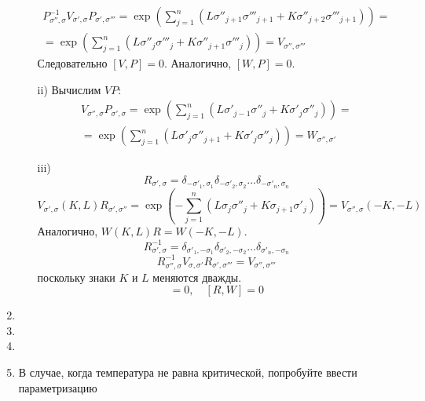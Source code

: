 \documentclass[12pt]{article}
\theoremstyle{definition}
\begin{document}
\begin{enumerate}
\begin{itemize}
\begin{multline}
            P_{\sigma'',\sigma}^{-1}V_{\sigma',\sigma}P_{\sigma',\sigma'''}=\exp\left(\sum\limits_{j=1}^n(L\sigma''_{j+1}\sigma'''_{j+1}+K\sigma''_{j+2}\sigma'''_{j+1})\right)=\\=\exp\left(\sum\limits_{j=1}^n(L\sigma''_j\sigma'''_j+K\sigma''_{j+1}\sigma'''_j)\right)=V_{\sigma'',\sigma'''}
        \end{multline}
        Следовательно $[V,P]=0$. Аналогично, $[W,P]=0$.
        \item[ii)] Вычислим $VP$:
        \begin{multline}
            V_{\sigma'',\sigma}P_{\sigma',\sigma}=\exp\left(\sum\limits_{j=1}^n(L\sigma'_{j-1}\sigma''_j+K\sigma'_j\sigma''_j)\right)=\\=\exp\left(\sum\limits_{j=1}^n(L\sigma'_j\sigma''_{j+1}+K\sigma'_j\sigma''_j)\right)=W_{\sigma'',\sigma'}
        \end{multline}
        \item[iii)]
        \begin{equation}
            R_{\sigma',\sigma}=\delta_{-\sigma'_1,\sigma_1}\delta_{-\sigma'_2,\sigma_2}...\delta_{-\sigma'_n,\sigma_n}
        \end{equation}
        \begin{equation}
            V_{\sigma',\sigma}(K,L)R_{\sigma',\sigma''}=\exp(-\sum\limits_{j=1}^n(L\sigma_j\sigma''_j+K\sigma_{j+1}\sigma'_j))=V_{\sigma'',\sigma}(-K,-L)
        \end{equation}
        Аналогично, $W(K,L)R=W(-K,-L)$.
        \begin{equation}
            R^{-1}_{\sigma',\sigma}=\delta_{\sigma'_1,-\sigma_1}\delta_{\sigma'_2,-\sigma_2}...\delta_{\sigma'_n,-\sigma_n}
        \end{equation}
        \begin{equation}
            R^{-1}_{\sigma'',\sigma}V_{\sigma,\sigma'}R_{\sigma',\sigma'''}=V_{\sigma'',\sigma'''}
        \end{equation}
        поскольку знаки $K$ и $L$ меняются дважды.
        \begin{equation}
            [R,V]=0,\quad[R,W]=0
        \end{equation}
    \end{itemize}
    \item
    \item
    \item
    \item В случае, когда температура не равна критической, попробуйте ввести параметризацию
    \begin{equation}

\end{equation}
\end{enumerate}
\end{document}
